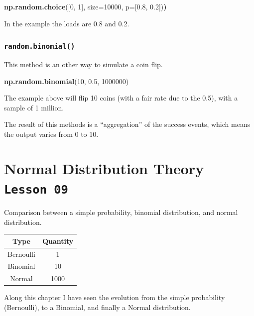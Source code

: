 \documentclass[]{book}
\newenvironment{Shaded}{\begin{snugshade}}{\end{snugshade}}
\newcommand{\KeywordTok}[1]{\textcolor[rgb]{0.13,0.29,0.53}{\textbf{#1}}}
\newcommand{\DataTypeTok}[1]{\textcolor[rgb]{0.13,0.29,0.53}{#1}}
\newcommand{\DecValTok}[1]{\textcolor[rgb]{0.00,0.00,0.81}{#1}}
\newcommand{\FloatTok}[1]{\textcolor[rgb]{0.00,0.00,0.81}{#1}}
\newcommand{\ErrorTok}[1]{\textcolor[rgb]{0.64,0.00,0.00}{\textbf{#1}}}
\newcommand{\NormalTok}[1]{#1}
\begin{document}
\begin{Shaded}
\begin{Highlighting}[]
\KeywordTok{np.random.choice}\NormalTok{([}\DecValTok{0}\NormalTok{, }\DecValTok{1}\NormalTok{], }\DataTypeTok{size=}\DecValTok{10000}\NormalTok{, }\DataTypeTok{p=}\NormalTok{[}\FloatTok{0.8}\NormalTok{, }\FloatTok{0.2}\NormalTok{])}\ErrorTok{)}
\end{Highlighting}
\end{Shaded}

In the example the loads are 0.8 and 0.2.

\subsubsection{\texorpdfstring{\texttt{random.binomial()}}{random.binomial()}}\label{random.binomial}

This method is an other way to simulate a coin flip.

\begin{Shaded}
\begin{Highlighting}[]
\KeywordTok{np.random.binomial}\NormalTok{(}\DecValTok{10}\NormalTok{, }\FloatTok{0.5}\NormalTok{, }\DecValTok{1000000}\NormalTok{)}
\end{Highlighting}
\end{Shaded}

The example above will flip 10 coins (with a fair rate due to the 0.5),
with a sample of 1 million.

The result of this methods is a ``aggregation'' of the success events,
which means the output varies from 0 to 10.

\section{\texorpdfstring{Normal Distribution Theory
\texttt{Lesson\ 09}}{Normal Distribution Theory Lesson 09}}\label{normal-distribution-theory-lesson-09}

Comparison between a simple probability, binomial distribution, and
normal distribution.

\begin{longtable}[]{@{}cc@{}}
\toprule
Type & Quantity\tabularnewline
\midrule
\endhead
Bernoulli & 1\tabularnewline
Binomial & 10\tabularnewline
Normal & 1000\tabularnewline
\bottomrule
\end{longtable}

Along this chapter I have seen the evolution from the simple probability
(Bernoulli), to a Binomial, and finally a Normal distribution.
\end{document}
